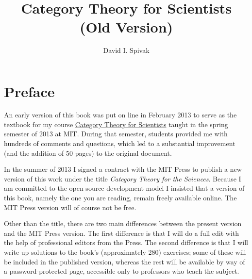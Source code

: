 \documentclass{book}
\theoremstyle{remark}
\theoremstyle{definition}
\begin{document}
\title{~\\~\\Category Theory for Scientists\\(Old Version)}
\author{David I. Spivak}
\maketitle

\chapter*{Preface}

An early version of this book was put on line in February 2013 to serve as the textbook for my course \href{http://math.mit.edu/~dspivak/teaching/sp13/}{\text Category Theory for Scientists} taught in the spring semester of 2013 at MIT. During that semester, students provided me with hundreds of comments and questions, which led to a substantial improvement (and the addition of 50 pages) to the original document. 

In the summer of 2013 I signed a contract with the MIT Press to publish a new version of this work under the title {\em Category Theory for the Sciences}. Because I am committed to the open source development model I insisted that a version of this book, namely the one you are reading, remain freely available online. The MIT Press version will of course not be free.

Other than the title, there are two main differences between the present version and the MIT Press version. The first difference is that I will do a full edit with the help of professional editors from the Press. The second difference is that I will write up solutions to the book's (approximately 280) exercises; some of these will be included in the published version, whereas the rest will be available by way of a password-protected page, accessible only to professors who teach the subject.
\end{document}
